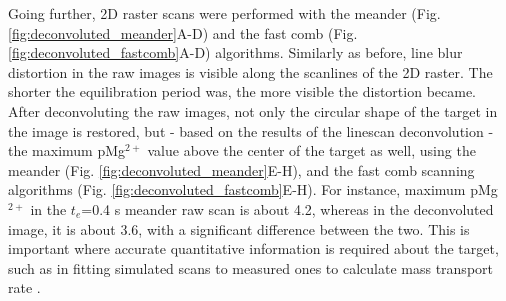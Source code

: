 Going further, 2D raster scans were performed with the meander (Fig. \ref{fig:deconvoluted_meander}A-D) and the fast comb (Fig. \ref{fig:deconvoluted_fastcomb}A-D) algorithms.
Similarly as before, line blur distortion in the raw images is visible along the scanlines of the 2D raster.
The shorter the equilibration period was, the more visible the distortion became.
After deconvoluting the raw images, not only the circular shape of the target in the image is restored, but - based on the results of the linescan deconvolution - the maximum pMg$^{2+}$ value above the center of the target as well, using the meander (Fig. \ref{fig:deconvoluted_meander}E-H), and the fast comb scanning algorithms (Fig. \ref{fig:deconvoluted_fastcomb}E-H).
For instance, maximum pMg$^{2+}$ in the $t_e$=0.4 s meander raw scan is about 4.2, whereas in the deconvoluted image, it is about 3.6, with a significant difference between the two.
This is important where accurate quantitative information is required about the target, such as in fitting simulated scans to measured ones to calculate mass transport rate \cite{gyurcsanyi2004chemical}.\def\s{0.25}

